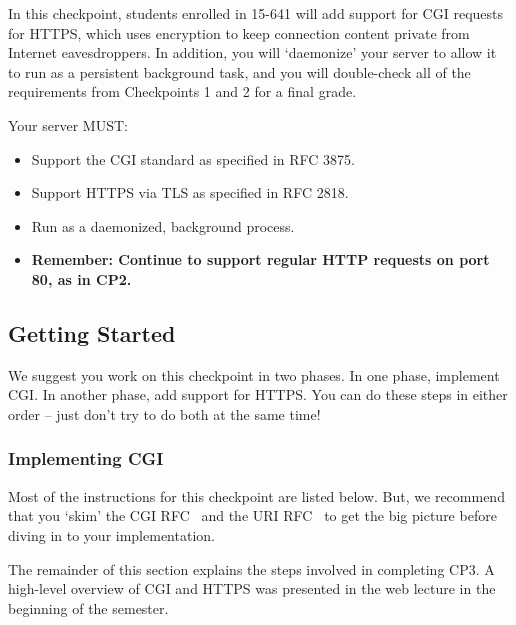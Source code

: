\label{sec:cp3}
In this checkpoint, students enrolled in 15-641 will add support for
CGI requests for HTTPS, which uses encryption to keep connection
content private from Internet eavesdroppers.  In addition, you will
`daemonize' your server to allow it to run as a persistent background
task, and you will double-check all of the requirements from
Checkpoints 1 and 2 for a final grade.

\vspace{5pt}
\noindent Your server MUST:
\begin{itemize}
  \item Support the CGI standard as specified in RFC 3875.
  \item Support HTTPS via TLS as specified in RFC 2818.
  \item Run as a daemonized, background process.
  \item {\bf Remember: Continue to support regular HTTP requests on port 80, as in CP2.}
\end{itemize}

\subsection{Getting Started}
We suggest you work on this checkpoint in two phases. In one phase, implement CGI. In another phase, add support for HTTPS. You can do these steps in either order -- just don't try to do both at the same time!

\subsubsection{Implementing CGI}

  Most of the instructions for this checkpoint are listed below. But, we recommend that you `skim' the CGI RFC~\cite{cgirfc} and the URI RFC~\cite{urirfc} to get the big picture before diving in to your implementation.

The remainder of this section explains the steps involved in completing CP3.  A high-level overview of
CGI and HTTPS was presented in the web lecture in the beginning of the semester.

